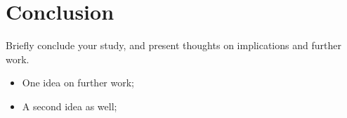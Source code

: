 \documentclass[fleqn,10pt]{wlscirep}
\begin{document}
\section{Conclusion}
Briefly conclude your study, and present thoughts on implications and further work.

\begin{itemize}
	\item One idea on further work;
	\item A second idea as well;
\end{itemize}


\end{document}
